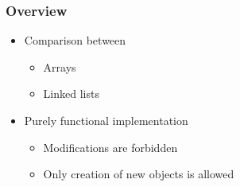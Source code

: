 \begin{frame}
    \frametitle{Overview}
    \begin{itemize}
        \item Comparison between
              \begin{itemize}
                  \item Arrays
                  \item Linked lists
              \end{itemize}
              \vskip4mm
        \item Purely functional implementation
              \begin{itemize}
                \item Modifications are forbidden
                \item Only creation of new objects is allowed
              \end{itemize}
    \end{itemize}
\end{frame}
